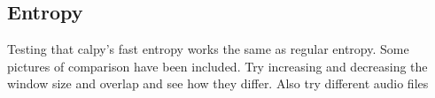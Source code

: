 \subsection{Entropy} 

Testing that calpy's fast entropy works the same as regular entropy. Some pictures of comparison have been included. Try increasing and decreasing the window size and overlap and see how they differ. Also try different audio files

